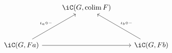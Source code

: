 \[\begin{tikzcd}
	& {\iC(G,\colim F)} \\
	\\
	{\iC(G,Fa)} && {\iC(G,Fb)}
	\arrow[from=3-1, to=3-3]
	\arrow["{\iota_{a} \circ \blank}", from=3-1, to=1-2]
	\arrow["{\iota_{b} \circ \blank}"', from=3-3, to=1-2]
\end{tikzcd}\]